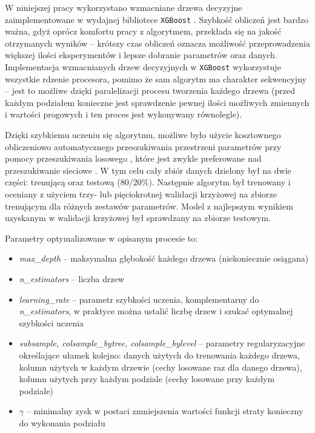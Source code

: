W niniejszej pracy wykorzystano wzmacniane drzewa decyzyjne zaimplementowane w wydajnej bibliotece \texttt{XGBoost} \cite{chen16}. Szybkość obliczeń jest bardzo ważna, gdyż oprócz komfortu pracy z algorytmem, przekłada się
na jakość otrzymanych wyników -- krótszy czas obliczeń oznacza możliwość przeprowadzenia większej ilości eksperymentów i lepsze dobranie parametrów oraz danych.
Implementacja wzmacnianych drzew decyzyjnych w \texttt{XGBoost} wykorzystuje wszystkie rdzenie procesora, pomimo że sam algorytm ma charakter sekwencyjny -- jest to możliwe dzięki paralelizacji procesu tworzenia każdego drzewa (przed każdym podziałem konieczne jest sprawdzenie pewnej ilości możliwych zmiennych i wartości progowych i ten proces jest wykonywany równolegle).

Dzięki szybkiemu uczeniu się algorytmu, możliwe było użycie kosztownego obliczeniowo automatycznego przeszukiwania przestrzeni parametrów przy pomocy przeszukiwania losowego , które jest zwykle preferowane nad przeszukiwanie sieciowe \cite{bergstra12}. W tym celu cały zbiór danych dzielony był na dwie części: trenującą oraz testową (80/20\%). Następnie algorytm był trenowany i oceniany z użyciem trzy- lub pięciokrotnej walidacji krzyżowej  na zbiorze trenującym dla różnych zestawów parametrów. Model z najlepszym wynikiem uzyskanym w walidacji krzyżowej był sprawdzany na zbiorze testowym.

Parametry optymalizowane w opisanym procesie to:
\begin{itemize}
	\item \textit{max\_depth} -- maksymalna głębokość każdego drzewa (niekoniecznie osiągana)
	\item \textit{n\_estimators} -- liczba drzew
	\item \textit{learning\_rate} -- parametr szybkości uczenia, komplementarny do \textit{n\_estimators}, w praktyce można ustalić liczbę drzew i szukać optymalnej szybkości uczenia
	\item \textit{subsample, colsample\_bytree, colsample\_bylevel} -- parametry regularyzacyjne określające ułamek kolejno: danych użytych do trenowania każdego drzewa, kolumn użytych w każdym drzewie (cechy losowane raz dla danego drzewa), kolumn użytych przy każdym podziale (cechy losowane przy każdym podziale)
	 \item $\gamma$ -- minimalny zysk w postaci zmniejszenia wartości funkcji straty konieczny do wykonania podziału
\end{itemize}

